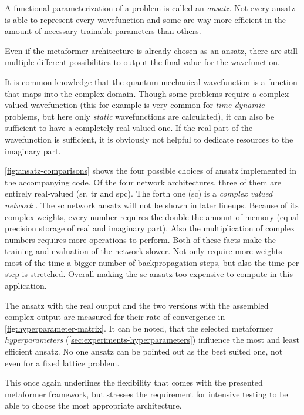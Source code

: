 A functional parameterization of a problem is called an \emph{ansatz}. 
Not every ansatz is able to represent every wavefunction and some are way more efficient in the amount of necessary trainable parameters than others.

Even if the metaformer architecture is already chosen as an ansatz, there are still multiple different possibilities to output the final value for the wavefunction.

It is common knowledge that the quantum mechanical wavefunction is a function that maps into the complex domain.
Though some problems require a complex valued wavefunction (this for example is very common for \emph{time-dynamic} problems, but here only \emph{static} wavefunctions are calculated), it can also be sufficient to have a completely real valued one.
If the real part of the wavefunction is sufficient, it is obviously not helpful to dedicate resources to the imaginary part.

\autoref{fig:ansatz-comparisons} shows the four possible choices of ansatz implemented in the accompanying code.
Of the four network architectures, three of them are entirely real-valued (sr, tr and spc). 
The forth one (sc) is a \emph{complex valued network} \cite{deepComplexNetworks}.
The sc network ansatz will not be shown in later lineups. 
Because of its complex weights, every number requires the double the amount of memory (equal precision storage of real  and imaginary part). 
Also the multiplication of complex numbers requires more operations to perform.
Both of these facts make the training and evaluation of the network slower. 
Not only require more weights most of the time a bigger number of backpropagation steps, but also the time per step is stretched. 
Overall making the sc ansatz too expensive to compute in this application.

The ansatz with the real output and the two versions with the assembled complex output are measured for their rate of convergence in \autoref{fig:hyperparameter-matrix}.
It can be noted, that the selected metaformer \emph{hyperparameters} (\autoref{sec:experiments-hyperparameters}) influence the most and least efficient ansatz.
No one ansatz can be pointed out as the best suited one, not even for a fixed lattice problem.

This once again underlines the flexibility that comes with the presented metaformer framework, but stresses the requirement for intensive testing to be able to choose the most appropriate architecture.

